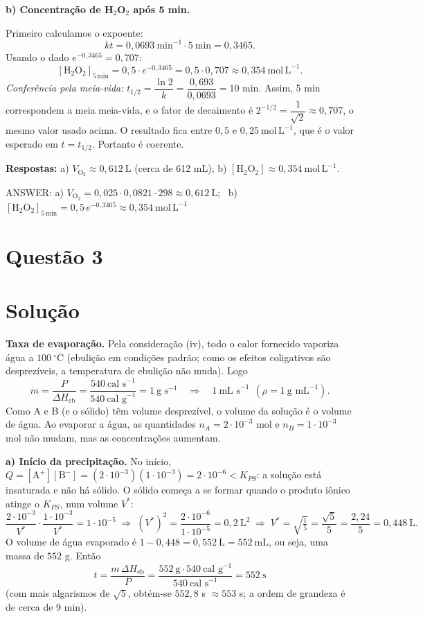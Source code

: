 \documentclass{article}%
\begin{document}
\medskip
\textbf{b) Concentração de H$_2$O$_2$ após 5 min.}

Primeiro calculamos o expoente:
\[
kt=0{,}0693\ \text{min}^{-1}\cdot 5\ \text{min}=0{,}3465 .
\]
Usando o dado $e^{-0{,}3465}=0{,}707$:
\[
[\text{H}_2\text{O}_2]_{5\,\text{min}}=0{,}5\cdot e^{-0{,}3465}=0{,}5\cdot 0{,}707\approx 0{,}354\ \text{mol}\,\text{L}^{-1}.
\]
\textit{Conferência pela meia-vida:} $t_{1/2}=\dfrac{\ln 2}{k}=\dfrac{0{,}693}{0{,}0693}=10$ min. Assim, 5 min correspondem a meia meia-vida, e o fator de decaimento é $2^{-1/2}=\dfrac{1}{\sqrt2}\approx 0{,}707$, o mesmo valor usado acima. O resultado fica entre $0{,}5$ e $0{,}25\ \text{mol}\,\text{L}^{-1}$, que é o valor esperado em $t=t_{1/2}$. Portanto é coerente.

\medskip
\textbf{Respostas:} a) $V_{\text{O}_2}\approx 0{,}612\ \text{L}$ (cerca de 612 mL); \quad b) $[\text{H}_2\text{O}_2]\approx 0{,}354\ \text{mol}\,\text{L}^{-1}$.

ANSWER: a) $V_{\text{O}_2}=0{,}025\cdot 0{,}0821\cdot 298\approx 0{,}612\ \text{L}$; \ b) $[\text{H}_2\text{O}_2]_{5\,\text{min}}=0{,}5\,e^{-0{,}3465}\approx 0{,}354\ \text{mol}\,\text{L}^{-1}$%
\newpage%
\section*{Questão 3}

\section*{Solução}

\textbf{Taxa de evaporação.} Pela consideração (iv), todo o calor fornecido vaporiza água a $100\ ^\circ\text{C}$ (ebulição em condições padrão; como os efeitos coligativos são desprezíveis, a temperatura de ebulição não muda). Logo
\[
\dot m=\frac{P}{\Delta H_{\text{eb}}}=\frac{540\ \text{cal s}^{-1}}{540\ \text{cal g}^{-1}}=1\ \text{g s}^{-1}
\quad\Rightarrow\quad 1\ \text{mL s}^{-1}\ \ (\rho=1\ \text{g mL}^{-1}).
\]
Como A e B (e o sólido) têm volume desprezível, o volume da solução é o volume de água. Ao evaporar a água, as quantidades $n_A=2\cdot10^{-3}$ mol e $n_B=1\cdot10^{-3}$ mol não mudam, mas as concentrações aumentam.

\textbf{a) Início da precipitação.} No início, $Q=[\text{A}^+][\text{B}^-]=(2\cdot10^{-3})(1\cdot10^{-3})=2\cdot10^{-6}<K_{PS}$: a solução está insaturada e não há sólido. O sólido começa a se formar quando o produto iônico atinge o $K_{PS}$, num volume $V^*$:
\[
\frac{2\cdot10^{-3}}{V^*}\cdot\frac{1\cdot10^{-3}}{V^*}=1\cdot10^{-5}
\;\Rightarrow\; (V^*)^2=\frac{2\cdot10^{-6}}{1\cdot10^{-5}}=0{,}2\ \text{L}^2
\;\Rightarrow\; V^*=\sqrt{\tfrac15}=\frac{\sqrt5}{5}=\frac{2{,}24}{5}=0{,}448\ \text{L}.
\]
O volume de água evaporado é $1-0{,}448=0{,}552\ \text{L}=552\ \text{mL}$, ou seja, uma massa de $552$ g. Então
\[
t=\frac{m\,\Delta H_{\text{eb}}}{P}=\frac{552\ \text{g}\cdot 540\ \text{cal g}^{-1}}{540\ \text{cal s}^{-1}}=552\ \text{s}
\]
(com mais algarismos de $\sqrt5$, obtém-se $552{,}8$ s $\approx 553$ s; a ordem de grandeza é de cerca de 9 min).
\end{document}
